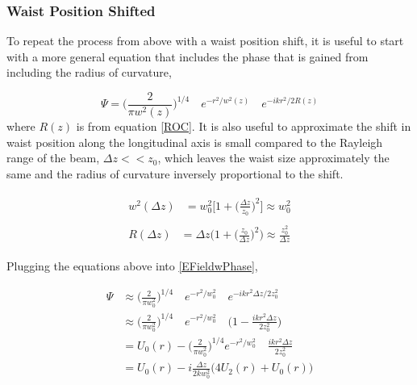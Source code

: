 		\subsubsection{Waist Position Shifted}
		To repeat the process from above with a waist position shift, it is useful to start with a more general equation that includes the phase that is gained from including the radius of curvature,
		
		\begin{equation}\label{EFieldwPhase}
		\Psi = 	\bigg( \frac{2}{\pi w^2(z)} \bigg)^{1/4} \quad e^{-r^2/w^2(z)} \quad e^{-ikr^2/2R(z)}
		\end{equation}
		where $R(z)$ is from equation \ref{ROC}.  It is also useful to approximate the shift in waist position along the longitudinal axis is small compared to the Rayleigh range of the beam, $\Delta z << z_0$, which leaves the waist size approximately the same and the radius of curvature inversely proportional to the shift. 
		
		\begin{subequations}
		\begin{align}
		\begin{split}
			w^2(\Delta z)	&= 	w^2_0 \bigg[1 + \bigg(\frac{\Delta z}{z_0}  \bigg)^2 \bigg]  \approx	w^2_0
		\end{split}\\
		\begin{split}
			R(\Delta z) 	&=	\Delta z \bigg(1 + \bigg(\frac{z_0}{\Delta z}\bigg)^2\bigg) \approx	\frac{z_0^2}{\Delta z}
		\end{split}
		\end{align}
		\end{subequations}

		Plugging the equations above into \ref{EFieldwPhase},
		
		\begin{equation}
		\begin{aligned}
		\Psi 	&\approx	\bigg( \frac{2}{\pi w_0^2} \bigg)^{1/4} \quad e^{-r^2/w_0^2} \quad e^{-ikr^2 \Delta z /2 z_0^2}
		\\		&\approx	\bigg( \frac{2}{\pi w_0^2} \bigg)^{1/4} \quad e^{-r^2/w_0^2} \quad \bigg( 1-\frac{ikr^2 \Delta z}{2 z_0^2}  \bigg)
		\\		&=			U_0(r) - \bigg( \frac{2}{\pi w_0^2} \bigg)^{1/4} e^{-r^2/w_0^2} \quad \frac{ikr^2 \Delta z}{2 z_0^2}
		\\		&=			U_0(r) - i \frac{\Delta z}{2k w_0^2} \bigg( 4U_2(r) + U_0(r) \bigg)
		\end{aligned}
		\end{equation}
		
